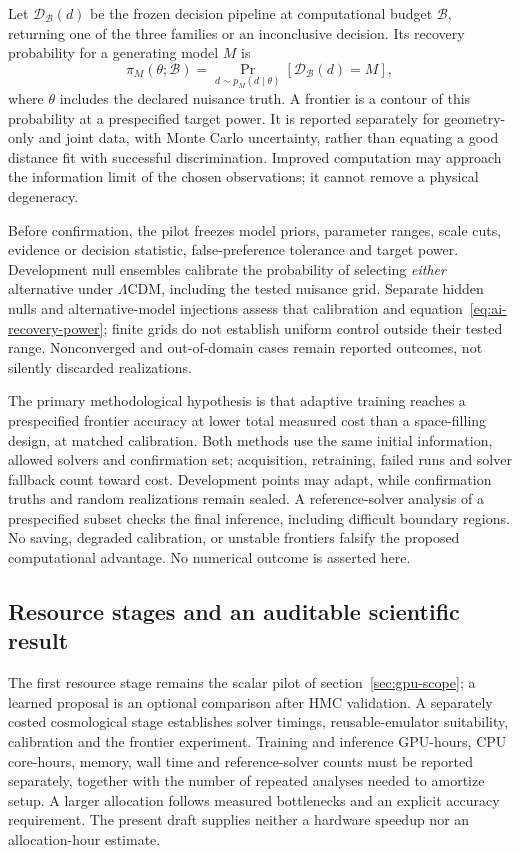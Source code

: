 Let $\mathcal D_{\mathcal B}(d)$ be the frozen decision pipeline at computational budget $\mathcal B$, returning one of the three families or an inconclusive decision.  Its recovery probability for a generating model $M$ is
\begin{equation}
 \pi_M(\theta;\mathcal B)
 =\Pr_{d\sim p_M(d\mid\theta)}
 \left[\mathcal D_{\mathcal B}(d)=M\right],
\label{eq:ai-recovery-power}
\end{equation}
where $\theta$ includes the declared nuisance truth.  A frontier is a contour of this probability at a prespecified target power.  It is reported separately for geometry-only and joint data, with Monte Carlo uncertainty, rather than equating a good distance fit with successful discrimination.  Improved computation may approach the information limit of the chosen observations; it cannot remove a physical degeneracy.

Before confirmation, the pilot freezes model priors, parameter ranges, scale cuts, evidence or decision statistic, false-preference tolerance and target power.  Development null ensembles calibrate the probability of selecting \emph{either} alternative under $\Lambda$CDM, including the tested nuisance grid.  Separate hidden nulls and alternative-model injections assess that calibration and equation~\eqref{eq:ai-recovery-power}; finite grids do not establish uniform control outside their tested range.  Nonconverged and out-of-domain cases remain reported outcomes, not silently discarded realizations.

The primary methodological hypothesis is that adaptive training reaches a prespecified frontier accuracy at lower total measured cost than a space-filling design, at matched calibration.  Both methods use the same initial information, allowed solvers and confirmation set; acquisition, retraining, failed runs and solver fallback count toward cost.  Development points may adapt, while confirmation truths and random realizations remain sealed.  A reference-solver analysis of a prespecified subset checks the final inference, including difficult boundary regions.  No saving, degraded calibration, or unstable frontiers falsify the proposed computational advantage.  No numerical outcome is asserted here.

\subsection{Resource stages and an auditable scientific result}

The first resource stage remains the scalar pilot of section~\ref{sec:gpu-scope}; a learned proposal is an optional comparison after HMC validation.  A separately costed cosmological stage establishes solver timings, reusable-emulator suitability, calibration and the frontier experiment.  Training and inference GPU-hours, CPU core-hours, memory, wall time and reference-solver counts must be reported separately, together with the number of repeated analyses needed to amortize setup.  A larger allocation follows measured bottlenecks and an explicit accuracy requirement.  The present draft supplies neither a hardware speedup nor an allocation-hour estimate.


